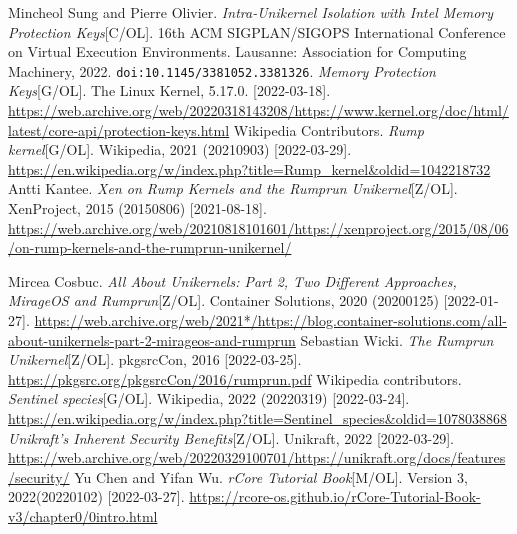\documentclass[UTF8,fontset=none,linespread=1.15]{ctexart}
\begin{document}
\begin{thebibliography}{99}
 Mincheol Sung and Pierre Olivier. \textit{Intra-Unikernel Isolation with Intel Memory Protection Keys}[C/OL]. 16th ACM SIGPLAN/SIGOPS International Conference on Virtual Execution Environments. Lausanne: Association for Computing Machinery, 2022. \texttt{doi:10.1145/3381052.3381326}.
 \textit{Memory Protection Keys}[G/OL]. The Linux Kernel, 5.17.0. [2022-03-18]. \url{https://web.archive.org/web/20220318143208/https://www.kernel.org/doc/html/latest/core-api/protection-keys.html}
 Wikipedia Contributors. \textit{Rump kernel}[G/OL]. Wikipedia, 2021 (20210903) [2022-03-29]. \url{https://en.wikipedia.org/w/index.php?title=Rump_kernel&oldid=1042218732}
 Antti Kantee. \textit{Xen on Rump Kernels and the Rumprun Unikernel}[Z/OL]. XenProject, 2015 (20150806) [2021-08-18].  \url{https://web.archive.org/web/20210818101601/https://xenproject.org/2015/08/06/on-rump-kernels-and-the-rumprun-unikernel/}

 Mircea Cosbuc. \textit{All About Unikernels: Part 2, Two Different Approaches, MirageOS and Rumprun}[Z/OL]. Container Solutions, 2020 (20200125) [2022-01-27]. \url{https://web.archive.org/web/2021*/https://blog.container-solutions.com/all-about-unikernels-part-2-mirageos-and-rumprun}
 Sebastian Wicki. \textit{The Rumprun Unikernel}[Z/OL]. pkgsrcCon, 2016
[2022-03-25]. \url{https://pkgsrc.org/pkgsrcCon/2016/rumprun.pdf}
 Wikipedia contributors. \textit{Sentinel species}[G/OL]. Wikipedia, 2022 (20220319) [2022-03-24]. \url{https://en.wikipedia.org/w/index.php?title=Sentinel_species&oldid=1078038868}
 \textit{Unikraft's Inherent Security Benefits}[Z/OL]. Unikraft, 2022 [2022-03-29]. \url{https://web.archive.org/web/20220329100701/https://unikraft.org/docs/features/security/}
 Yu Chen and Yifan Wu. \textit{rCore Tutorial Book}[M/OL]. Version 3,
2022(20220102) [2022-03-27]. \url{https://rcore-os.github.io/rCore-Tutorial-Book-v3/chapter0/0intro.html}
\end{thebibliography}
\end{document}
